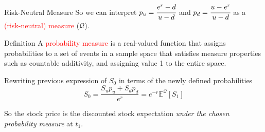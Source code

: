 \documentclass{beamer}
\begin{document}
\begin{frame}{Risk-Neutral Measure}
	So we can interpret $p_u=\cfrac{e^r -d}{u-d}$ and $p_d=\cfrac{u - e^r}{u-d}$ as a \textcolor{red}{(risk-neutral) measure} ($\mathcal{Q}$).\vspace{0.3cm}
	
	\begin{block}{Definition}
		A \textcolor{red}{probability measure} is a real-valued function that assigns probabilities to a set of events in a sample space that satisfies measure properties such as countable additivity, and assigning value 1 to the entire space.
	\end{block}	

	Rewriting previous expression of $S_0$ in terms of the newly defined probabilities
	\begin{equation}
		S_0 = \frac{S_up_u + S_dp_d}{e^r} = e^{-r}\mathbb{E}^\mathcal{Q}[S_1]
		\label{eq:risk_neutral_price}
	\end{equation}
	
	So the stock price is the discounted stock expectation \emph{under the chosen probability measure} at $t_1$.
\end{frame}
\end{document}

